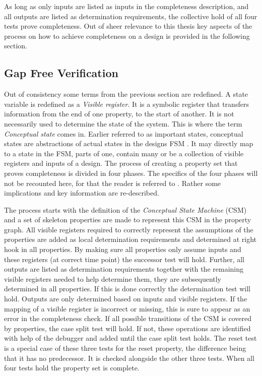 As long as only inputs are listed as inputs in the completeness description, and all outputs are listed as determination requirements, the collective hold of all four tests prove completeness. Out of sheer relevance to this thesis key aspects of the process on how to achieve completeness on a design is provided in the following section. 

\subsection{Gap Free Verification}
\label{subsec:gfv}
Out of consistency some terms from the previous section are redefined. A state variable is redefined as a \textit{Visible register}. It is a symbolic register that transfers information from the end of one property, to the start of another. It is not necessarily used to determine the state of the system. This is where the term \textit{Conceptual state} comes in. Earlier referred to as important states, conceptual states are abstractions of actual states in the designs FSM . It may directly map to a state in the FSM, parts of one,  contain many or be a collection of visible registers and inputs of a design. The process of creating a property set that proves completeness is divided in four phases. The specifics of the four phases will not be recounted here, for that the reader is referred to \cite{gapfree}. Rather some implications and key information are re-described. \par
The process starts with the definition of the \textit{Conceptual State Machine} (CSM) and a set of skeleton properties are made to represent this CSM in the property graph. All visible registers required to correctly represent the assumptions of the properties are added as local determination requirements and determined at right hook in all properties. By making sure all properties only assume inputs and these registers (at correct time point) the successor test will hold. Further, all outputs are listed as determination requirements together with the remaining visible registers needed to help determine them, they are subsequently determined in all properties. If this is done correctly the determination test will hold. Outputs are only determined based on inputs and visible registers. If the mapping of a visible register is incorrect or missing, this is sure to appear as an error in the completeness check. If all possible transitions of the CSM is covered by properties, the case split test will hold. If not, these operations are identified with help of the debugger and added until the case split test holds. The reset test is a special case of these three tests for the reset property, the difference being that it has no predecessor. It is checked alongside the other three tests. When all four tests hold the property set is complete. 

